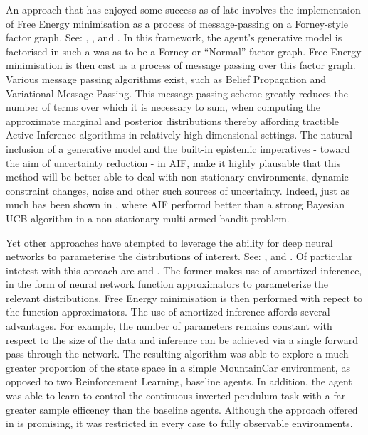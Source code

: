 \documentclass[12pt, twoside]{report}
\begin{document}
An approach that has enjoyed some success as of late involves the implementaion of Free Energy minimisation as a process of message-passing on a Forney-style factor graph. See: \textcite{Sim-AIF-Message}, \textcite{Cox-2019}, \textcite{Reactive-MP} and \textcite{Deep-Temp-AIF}. In this framework, the agent's generative model is factorised in such a was as to be a Forney or ``Normal'' factor graph. Free Energy minimisation is then cast as a process of message passing over this factor graph. Various message passing algorithms exist, such as Belief Propagation and Variational Message Passing. This message passing scheme greatly reduces the number of terms over which it is necessary to sum, when computing the approximate marginal and posterior distributions thereby affording tractible Active Inference algorithms in relatively high-dimensional settings. The natural inclusion of a generative model and the built-in epistemic imperatives - toward the aim of uncertainty reduction - in AIF, make it highly plausable that this method will be better able to deal with non-stationary environments, dynamic constraint changes, noise and other such sources of uncertainty. Indeed, just as much has been shown in \textcite{Bandits}, where AIF performd better than a strong Bayesian UCB algorithm in a non-stationary multi-armed bandit problem.

Yet other approaches have atempted to leverage the ability for deep neural networks to parameterise the distributions of interest. See: \textcite{Deep-AIF-Ueltzh-2018}, \textcite{Deep-Var-Policy-Grad} and \textcite{DEEP-AIF-POMDPs}. Of particular intetest with this aproach are \textcite{Scaling-AIF} and \textcite{Contrastive-AIF}. The former makes use of amortized inference, in the form of neural network function approximators to parameterize the relevant distributions. Free Energy minimisation is then performed with repect to the function approximators. The use of amortized inference affords several advantages. For example, the number of parameters remains constant with respect to the size of the data and inference can be achieved via a single forward pass through the network. The resulting algorithm was able to explore a much greater proportion of the state space in a simple MountainCar environment, as opposed to two Reinforcement Learning, baseline agents. In addition, the agent was able to learn to control the continuous inverted pendulum task with a far greater sample efficency than the baseline agents. Although the approach offered in \textcite{Scaling-AIF} is promising, it was restricted in every case to fully observable environments. 
\end{document}
